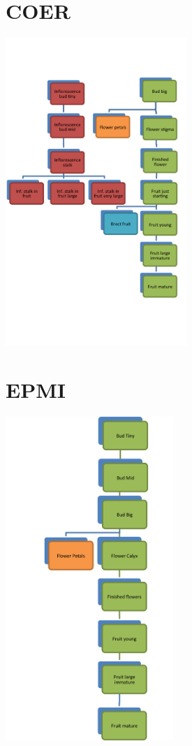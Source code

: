 \documentclass[10pt]{book} %
\begin{document}
\section{COER}
\begin{multicols}{2}
\includegraphics[width=2.7in]{COER.png}
\vfill
\columnbreak

\end{multicols}

\clearpage
\newpage


\section{EPMI}
\begin{multicols}{2}
\includegraphics[width=2.5in]{EPMI.png}
\vfill
\columnbreak

\end{multicols}
\end{document}
